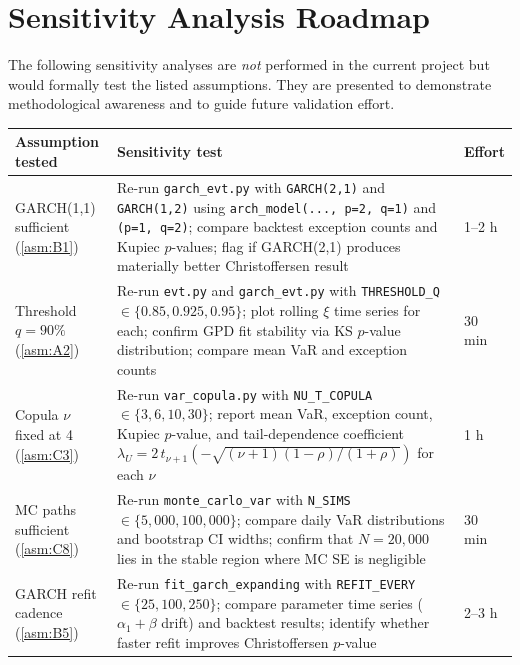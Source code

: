 \documentclass[11pt,a4paper]{article}
\newcommand{\code}[1]{\texttt{#1}}
\begin{document}
\section{Sensitivity Analysis Roadmap}\label{sec:sensitivity-roadmap}

The following sensitivity analyses are \emph{not} performed in the current
project but would formally test the listed assumptions. They are presented
to demonstrate methodological awareness and to guide future validation effort.

\medskip
\begin{tabularx}{\textwidth}{@{}p{3.8cm} X p{2.0cm}@{}}
\toprule
\textbf{Assumption tested} & \textbf{Sensitivity test} & \textbf{Effort} \\
\midrule

GARCH(1,1) sufficient (\cref{asm:B1}) &
Re-run \code{garch\_evt.py} with \code{GARCH(2,1)} and \code{GARCH(1,2)}
using \code{arch\_model(..., p=2, q=1)} and \code{(p=1, q=2)};
compare backtest exception counts and Kupiec $p$-values; flag if
GARCH(2,1) produces materially better Christoffersen result &
1--2 h \\[4pt]

Threshold $q = 90\%$ (\cref{asm:A2}) &
Re-run \code{evt.py} and \code{garch\_evt.py} with
\code{THRESHOLD\_Q} $\in \{0.85, 0.925, 0.95\}$;
plot rolling $\xi$ time series for each; confirm GPD fit stability
via KS $p$-value distribution; compare mean VaR and exception counts &
30 min \\[4pt]

Copula $\nu$ fixed at 4 (\cref{asm:C3}) &
Re-run \code{var\_copula.py} with \code{NU\_T\_COPULA}
$\in \{3, 6, 10, 30\}$; report mean VaR, exception count,
Kupiec $p$-value, and tail-dependence coefficient
$\lambda_U = 2\,t_{\nu+1}(-\sqrt{(\nu+1)(1-\rho)/(1+\rho)})$
for each $\nu$ &
1 h \\[4pt]

MC paths sufficient (\cref{asm:C8}) &
Re-run \code{monte\_carlo\_var} with \code{N\_SIMS}
$\in \{5{,}000, 100{,}000\}$; compare daily VaR distributions
and bootstrap CI widths; confirm that $N = 20{,}000$ lies in the
stable region where MC SE is negligible &
30 min \\[4pt]

GARCH refit cadence (\cref{asm:B5}) &
Re-run \code{fit\_garch\_expanding} with \code{REFIT\_EVERY}
$\in \{25, 100, 250\}$; compare parameter time series
($\alpha_1 + \beta$ drift) and backtest results;
identify whether faster refit improves Christoffersen $p$-value &
2--3 h \\[4pt]


\end{tabularx}
\end{document}

